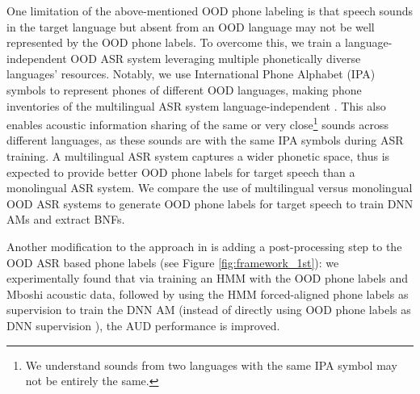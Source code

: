 \documentclass[a4paper]{article}
\begin{document}
One limitation of the above-mentioned OOD     phone labeling   is that speech sounds in the target language but absent from an OOD language may not be well represented by the OOD phone labels. To  overcome this, we %
train a language-independent OOD ASR system leveraging multiple phonetically diverse languages' resources. Notably,  we use International Phone Alphabet (IPA) symbols \cite{international1999handbook}   to represent phones of different OOD languages, making   phone inventories of the multilingual ASR system language-independent \cite{zelasko2020sounds}. This also enables acoustic information sharing of  the same  or  very close\footnote{We understand sounds from two languages with the same IPA symbol may not be entirely the same.}  sounds across different languages, as these sounds are with the same IPA symbols during   ASR  training.   A multilingual ASR system captures a wider phonetic space, thus is expected to provide better OOD phone labels for target speech than a monolingual  ASR system. We compare the use of multilingual versus monolingual OOD ASR systems to generate OOD phone labels for target speech to train DNN AMs and extract BNFs.

Another modification to the approach in \cite{feng2020unsupervised} is adding a post-processing step to  the OOD ASR based phone labels (see Figure \ref{fig:framework_1st}): we experimentally found that  via training an HMM with the OOD phone labels and Mboshi acoustic data, followed by 
using the HMM forced-aligned phone labels as supervision to train the DNN AM (instead of directly using OOD phone labels   as DNN supervision \cite{feng2020unsupervised}), the AUD performance is improved. %


\end{document}

